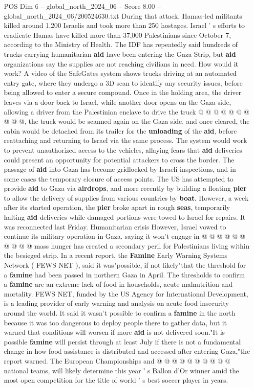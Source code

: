 \begin{textsample}{POS Dim 6 – global\_north\_2024\_06 – Score 8.00 – global\_north\_2024\_06/200524630.txt}
During that attack, Hamas-led militants killed around 1,200 Israelis and took more than 250 hostages.
Israel ' s efforts to eradicate Hamas have killed more than 37,000 Palestinians since October 7, according to the Ministry of Health.
The IDF has repeatedly said hundreds of trucks carrying humanitarian \textbf{aid} have been entering the Gaza Strip, but \textbf{aid} organizations say the supplies are not reaching civilians in need.
How would it work?
A video of the SafeGates system shows trucks driving at an automated entry gate, where they undergo a 3D scan to identify any security issues, before being allowed to enter a secure compound.
Once in the holding area, the driver leaves via a door back to Israel, while another door opens on the Gaza side, allowing a driver from the Palestinian enclave to drive the truck @ @ @ @ @ @ @ @ @ @, the truck would be scanned again on the Gaza side, and once cleared, the cabin would be detached from its trailer for the \textbf{unloading} of the \textbf{aid}, before reattaching and returning to Israel via the same process.
The system would work to prevent unauthorized access to the vehicles, allaying fears that \textbf{aid} deliveries could present an opportunity for potential attackers to cross the border.
The passage of \textbf{aid} into Gaza has become gridlocked by Israeli inspections, and in some cases the temporary closure of access points.
The US has attempted to provide \textbf{aid} to Gaza via \textbf{airdrops}, and more recently by building a floating \textbf{pier} to allow the delivery of supplies from various countries by \textbf{boat}.
However, a week after its started operation, the \textbf{pier} broke apart in rough \textbf{seas}, temporarily halting \textbf{aid} deliveries while damaged portions were towed to Israel for repairs.
It was reconnected last Friday.
Humanitarian crisis However, Israel vowed to continue its military operation in Gaza, saying it won't engage in @ @ @ @ @ @ @ @ @ @ mass hunger has created a secondary peril for Palestinians living within the besieged strip.
In a recent report, the \textbf{Famine} Early Warning Systems Network ( FEWS NET ), said it was"possible, if not likely"that the threshold for a \textbf{famine} had been passed in northern Gaza in April.
The thresholds to confirm a \textbf{famine} are an extreme lack of food in households, acute malnutrition and mortality.
FEWS NET, funded by the US Agency for International Development, is a leading provider of early warning and analysis on acute food insecurity around the world.
It said it wasn't possible to confirm a \textbf{famine} in the north because it was too dangerous to deploy people there to gather data, but it warned that conditions will worsen if more \textbf{aid} is not delivered soon."It is possible \textbf{famine} will persist through at least July if there is not a fundamental change in how food assistance is distributed and accessed after entering Gaza,"the report warned.
The European Championships and @ @ @ @ @ @ @ @ @ @ national teams, will likely determine this year ' s Ballon d'Or winner amid the most open competition for the title of world ' s best soccer player in years.


\end{textsample}
